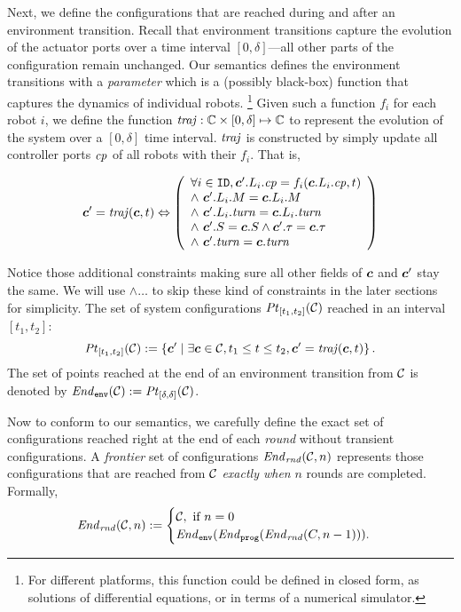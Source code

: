 Next, we define the configurations that are reached during and after an environment transition.
Recall that environment transitions capture the evolution of the actuator ports over a time interval $[0,\delta]$---all other parts of the configuration remain unchanged.
Our \lgname semantics defines the environment transitions with a \emph{parameter} which is a (possibly black-box) function that captures the dynamics of individual robots.%
\footnote{For different platforms, this function could be defined in closed form, as solutions of differential equations, or in terms of a numerical simulator.}
% 
Given such a function $f_i$ for each robot $i$, we  define the function $\mathit{traj}: \mathbb{C} \times \left[0,\delta\right] \mapsto \mathbb{C}$ to represent the  evolution of the system over a  $[0,\delta]$ time interval.
$\mathit{traj}$ is constructed by simply update all controller ports $\mathit{cp}$ of all robots with their $f_i$.
That is,
\begin{small}
\[
\mathit{\boldsymbol{c}}' = \mathit{traj}(\mathit{\boldsymbol{c}}, t) \Leftrightarrow
\left(
\begin{array}{l}
    \forall i \in \texttt{ID}, \mathit{\boldsymbol{c}}'.L_{i}.\mathit{cp} = f_i(\mathit{\boldsymbol{c}}.L_{i}.\mathit{cp}, t) \\
    \land\ \mathit{\boldsymbol{c}}'.L_{i}.M = \mathit{\boldsymbol{c}}.L_{i}.M \\
    \land\ \mathit{\boldsymbol{c}}'.L_{i}.\mathit{turn} = \mathit{\boldsymbol{c}}.L_{i}.\mathit{turn}\\
    \land\ \mathit{\boldsymbol{c}}'.S = \mathit{\boldsymbol{c}}.S \land \mathit{\boldsymbol{c}}'.\tau = \mathit{\boldsymbol{c}}.\tau \\
    \land\ \mathit{\boldsymbol{c}}'.\mathit{turn} = \mathit{\boldsymbol{c}}.\mathit{turn} \\
\end{array}
\right)
\]
\end{small}%
Notice those additional constraints making sure all other fields of $\mathit{\boldsymbol{c}}$ and $\mathit{\boldsymbol{c}}'$ stay the same.
We will use $\land \dots$ to skip these kind of constraints in the later sections for simplicity.
The set of system configurations $\mathit{Pt}_{[t_1,t_2]}(\mathcal{C})$ reached in an interval $[t_1,t_2]$:
\[
\mathit{Pt}_{[t_1,t_2]}(\mathcal{C}) := \left\{\mathit{\boldsymbol{c}}' \mid \exists \mathit{\boldsymbol{c}}\in \mathcal{C}, t_1 \leq t\leq t_2 , \mathit{\boldsymbol{c}}' = \mathit{traj}(\mathit{\boldsymbol{c}},t)\right\}.
\]
The set of points reached at the end of an environment transition from $\mathcal{C}$ is denoted by  $\mathit{End}_{\mathtt{env}}(\mathcal{C}) := \mathit{Pt}_{[\delta,\delta]}(\mathcal{C})$.

Now to conform to our semantics, we carefully define the exact set of configurations
reached right at the end of each \emph{round} without transient configurations.
A \emph{frontier} set of configurations $\mathit{End}_\mathit{rnd}(\mathcal{C}, n)$ represents those configurations
that are reached from $\mathcal{C}$ \emph{exactly when} $n$ rounds are completed.
Formally,
\[
\mathit{End}_\mathit{rnd}(\mathcal{C},n) :=
    \begin{cases}
        \mathcal{C}, \text{ if } n = 0\\
        \mathit{End}_{\mathtt{env}}(\mathit{End}_{\mathtt{prog}}(\mathit{End}_\mathit{rnd}(C,n-1))).
    \end{cases}
\]


